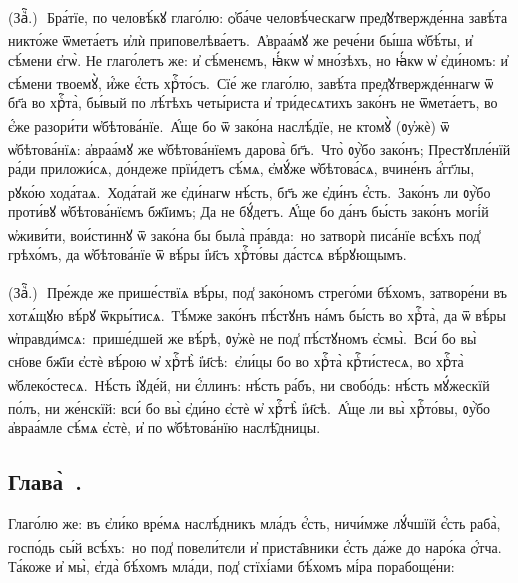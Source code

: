 (Заⷱ҇\:.)~\textsuperscript{}\,Бра́тїе, по человѣ́кꙋ глаго́лю: ѻ҆ба́че человѣ́ческагѡ пред̾ꙋтвержде́нна завѣ́та никто́же ѿмета́етъ и҆лѝ приповелѣва́етъ. \textsuperscript{}\,А҆враа́мꙋ же рече́ни бы́ша ѡ҆бѣ́ты, и҆ сѣ́мени є҆гѡ̀. Не глаго́летъ же: и҆ сѣ́менємъ, ꙗ҆́кѡ ѡ҆ мно́зѣхъ, но ꙗ҆́кѡ ѡ҆ є҆ди́номъ: и҆ сѣ́мени твоемꙋ̀, и҆́же є҆́сть хрⷭ҇то́съ. \textsuperscript{}\,Сїе́ же глаго́лю, завѣ́та пред̾ꙋтвержде́ннагѡ ѿ бг҃а во хрⷭ҇та̀, бы́вый по лѣ́тѣхъ четы́риста и҆ три́десѧтихъ зако́нъ не ѿмета́етъ, во є҆́же разори́ти ѡ҆бѣтова́нїе. \textsuperscript{}\,А҆́ще бо ѿ зако́на наслѣ́дїе, не ктомꙋ̀ (ᲂу҆жѐ) ѿ ѡ҆бѣтова́нїѧ: а҆враа́мꙋ же ѡ҆бѣтова́нїемъ дарова̀ бг҃ъ. \textsuperscript{}\,Что̀ ᲂу҆̀бо зако́нъ; Престꙋпле́нїй ра́ди приложи́сѧ, до́ндеже прїи́детъ сѣ́мѧ, є҆мꙋ́же ѡ҆бѣтова́сѧ, вчине́нъ а҆́гг҃лы, рꙋко́ю хода́таѧ. \textsuperscript{}\,Хода́тай же є҆ди́нагѡ нѣ́сть, бг҃ъ же є҆ди́нъ є҆́сть. \textsuperscript{}\,Зако́нъ ли ᲂу҆̀бо проти́вꙋ ѡ҆бѣтова́нїємъ бж҃їимъ; Да не бꙋ́детъ. А҆́ще бо да́нъ бы́сть зако́нъ могі́й ѡ҆живи́ти, вои́стиннꙋ ѿ зако́на бы была̀ пра́вда: \textsuperscript{}\,но затворѝ писа́нїе всѣ́хъ под̾ грѣхо́мъ, да ѡ҆бѣтова́нїе ѿ вѣ́ры і҆и҃съ хрⷭ҇то́вы да́стсѧ вѣ́рꙋющымъ.

(Заⷱ҇\:.)~\textsuperscript{}\,Пре́жде же прише́ствїѧ вѣ́ры, под̾ зако́номъ стрего́ми бѣ́хомъ, затворе́ни въ хотѧ́щꙋю вѣ́рꙋ ѿкры́тисѧ. \textsuperscript{}\,Тѣ́мже зако́нъ пѣ́стꙋнъ на́мъ бы́сть во хрⷭ҇та̀, да ѿ вѣ́ры ѡ҆правди́мсѧ: \textsuperscript{}\,прише́дшей же вѣ́рѣ, ᲂу҆жѐ не под̾ пѣ́стꙋномъ є҆смы̀. \textsuperscript{}\,Вси́ бо вы̀ сн҃ове бж҃їи є҆стѐ вѣ́рою ѡ҆ хрⷭ҇тѣ̀ і҆и҃сѣ: \textsuperscript{}\,є҆ли́цы бо во хрⷭ҇та̀ крⷭ҇ти́стесѧ, во хрⷭ҇та̀ ѡ҆блеко́стесѧ. \textsuperscript{}\,Нѣ́сть і҆ꙋде́й, ни є҆́ллинъ: нѣ́сть ра́бъ, ни свобо́дь: нѣ́сть мꙋ́жескїй по́лъ, ни же́нскїй: вси́ бо вы̀ є҆ди́но є҆стѐ ѡ҆ хрⷭ҇тѣ̀ і҆и҃сѣ. \textsuperscript{}\,А҆́ще ли вы̀ хрⷭ҇то́вы, ᲂу҆̀бо а҆враа́мле сѣ́мѧ є҆стѐ, и҆ по ѡ҆бѣтова́нїю наслѣ̑дницы.

\subsection{Глава̀~.}

\cuLettrine Глаго́лю же: въ є҆ли́ко вре́мѧ наслѣ́дникъ мла́дъ є҆́сть, ничи́мже лꙋ́чшїй є҆́сть раба̀, госпо́дь сы́й всѣ́хъ: \textsuperscript{}\,но под̾ повели́тєли и҆ приста̑вники є҆́сть да́же до наро́ка ѻ҆́тча. \textsuperscript{}\,Та́коже и҆ мы̀, є҆гда̀ бѣ́хомъ мла́ди, под̾ стїхі́ами бѣ́хомъ мі́ра порабоще́ни:

